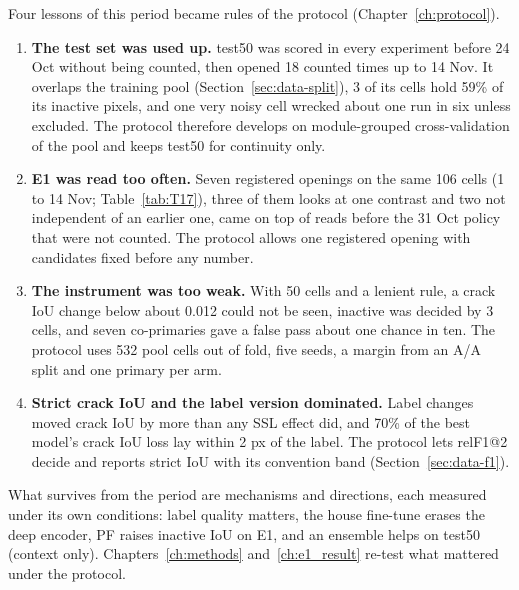 Four lessons of this period became rules of the protocol (Chapter~\ref{ch:protocol}).
\begin{enumerate}
  \item \textbf{The test set was used up.} test50 was scored in every experiment before 24 Oct without being counted, then opened 18
    counted times up to 14 Nov. It overlaps the training pool (Section~\ref{sec:data-split}), 3 of its cells hold 59\% of its inactive
    pixels, and one very noisy cell wrecked about one run in six unless excluded. The protocol therefore develops on module-grouped
    cross-validation of the pool and keeps test50 for continuity only.
  \item \textbf{E1 was read too often.} Seven registered openings on the same 106 cells (1 to 14 Nov; Table~\ref{tab:T17}), three of
    them looks at one contrast and two not independent of an earlier one, came on top of reads before the 31 Oct policy that were not
    counted. The protocol allows one registered opening with candidates fixed before any number.
  \item \textbf{The instrument was too weak.} With 50 cells and a lenient rule, a crack IoU change below about 0.012 could not be seen,
    inactive was decided by 3 cells, and seven co-primaries gave a false pass about one chance in ten. The protocol uses 532 pool cells out of fold,
    five seeds, a margin from an A/A split and one primary per arm.
  \item \textbf{Strict crack IoU and the label version dominated.} Label changes moved crack IoU by more than any SSL effect did, and
    70\% of the best model's crack IoU loss lay within 2 px of the label. The protocol lets relF1@2 decide and reports strict IoU with its
    convention band (Section~\ref{sec:data-f1}).
\end{enumerate}
What survives from the period are mechanisms and directions, each measured under its own conditions: label quality matters, the
house fine-tune erases the deep encoder, PF raises inactive IoU on E1, and an ensemble helps on test50 (context only). Chapters~\ref{ch:methods}
and~\ref{ch:e1_result} re-test what mattered under the protocol.
